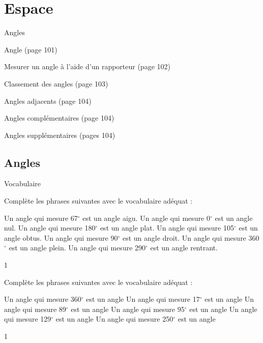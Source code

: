 \documentclass[a4paper,11pt]{report}
\begin{document}
\newcommand{\chapterName}{Espace}
\newcommand{\serieName}{Angles}


\chapter*{\chapterName}
\thispagestyle{empty}

\begin{amL}{\serieName}{
\item Angle (page 101)
\item Mesurer un angle à l'aide d'un rapporteur (page 102)
\item Classement des angles (page 103)
\item Angles adjacents (page 104)
\item Angles complémentaires (page 104)
\item Angles supplémentaires (pages 104)
}
\end{amL}
\section*{\serieName}
\setcounter{page}{1}
\thispagestyle{firstPage}





\begin{resolu}{Vocabulaire}{Complète les phrases suivantes avec le vocabulaire adéquat :
\begin{tasks}
\task Un angle qui mesure 67$^{\circ}$ est un angle {\color{blue} aigu}.
\task Un angle qui mesure 0$^{\circ}$ est un angle {\color{blue} nul}.
\task Un angle qui mesure 180$^{\circ}$ est un angle {\color{blue} plat}.
\task Un angle qui mesure 105$^{\circ}$ est un angle {\color{blue} obtus}.
\task Un angle qui mesure 90$^{\circ}$ est un angle {\color{blue} droit}.
\task Un angle qui mesure 360$^{\circ}$ est un angle {\color{blue} plein}.
\task Un angle qui mesure 290$^{\circ}$ est un angle {\color{blue} rentrant}.

\end{tasks}
}{1}
\end{resolu}

\begin{exop}{
Complète les phrases suivantes avec le vocabulaire adéquat :
\begin{tasks}
\task Un angle qui mesure 360$^{\circ}$ est un angle \hrulefill
\task Un angle qui mesure 17$^{\circ}$ est un angle \hrulefill
\task Un angle qui mesure 89$^{\circ}$ est un angle \hrulefill
\task Un angle qui mesure 95$^{\circ}$ est un angle \hrulefill
\task Un angle qui mesure 129$^{\circ}$ est un angle \hrulefill
\task Un angle qui mesure 250$^{\circ}$ est un angle \hrulefill
\end{tasks}}{1}
\end{exop}
\end{document}
